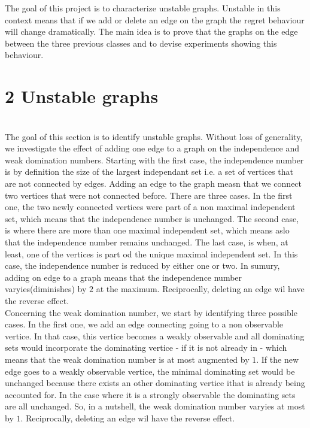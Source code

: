 \documentclass{article} %
\begin{document}
 The goal of this project is to characterize unstable graphs. Unstable in this context means that if we add or delete an edge on the graph the regret behaviour will change dramatically. The main idea is to prove that the graphs on the edge between the three previous classes and to devise experiments showing this behaviour.
 
\section*{2 Unstable graphs}
~\\
The goal of this section is to identify unstable graphs. Without loss of generality, we investigate the effect of adding one edge to a graph on the independence and weak domination numbers. Starting with the first case, the independence number is by definition the size of the largest independant set i.e. a set of vertices that are not connected by edges. Adding an edge to the graph measn that we connect two vertices that were not connected before. There are three cases. In the first one, the two newly connected vertices were part of a non maximal independent set, which means that the independence number is unchanged. The second case, is where there are more than one maximal independent set, which means aslo that the independence number remains unchanged. The last case, is when, at least, one of the vertices is part od the unique maximal independent set. In this case, the independence number is reduced by either one or two. In sumury, adding on edge to a graph means that the independence number varyies(diminishes) by $2$ at the maximum. Reciprocally, deleting an edge wil have the reverse effect.\\

Concerning the weak domination number, we start by identifying three possible cases. In the first one, we add an edge connecting going to a non observable vertice. In that case, this vertice becomes a weakly observable and all dominating sets would incorporate the dominating vertice - if it is not already in - which means that the weak domination number is at most augmented by $1$. If the new edge goes to a weakly observable vertice, the minimal dominating set would be unchanged because there exists an other dominating vertice ithat is already being accounted for. In the case where it is a strongly observable the dominating sets are all unchanged. So, in a nutshell, the weak domination number varyies at most by $1$. Reciprocally, deleting an edge wil have the reverse effect.\\
\end{document}
